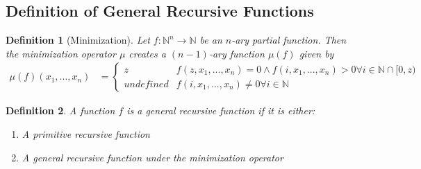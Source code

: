 \documentclass[12pt, letterpaper]{article}
\newtheorem*{definition}{Definition}
\theoremstyle{case}
\begin{document}
    \subsection{Definition of General Recursive Functions}
    \begin{definition}[Minimization]
      Let $f: \mathbb{N}^n \rightarrow \mathbb{N}$ be an $n$-ary partial function. Then the minimization operator $\mu$
      creates a $(n - 1)$-ary function $\mu(f)$ given by
      \begin{equation*}
        \begin{aligned}
          \mu(f)(x_1, ..., x_n) &=
          \begin{cases}
            z                       & f(z, x_1, ..., x_n) = 0 \wedge f(i, x_1, ..., x_n) > 0 \forall i \in \mathbb{N} \cap [0, z) \\
            undefined               & f(i, x_1, ..., x_n) \neq 0 \forall i \in \mathbb{N}
          \end{cases}
        \end{aligned}
      \end{equation*}
    \end{definition}
    \begin{definition}
      A function $f$ is a general recursive function if it is either:
      \begin{enumerate}
        \item A primitive recursive function
        \item A general recursive function under the minimization operator
      \end{enumerate}
    \end{definition}
\end{document}
